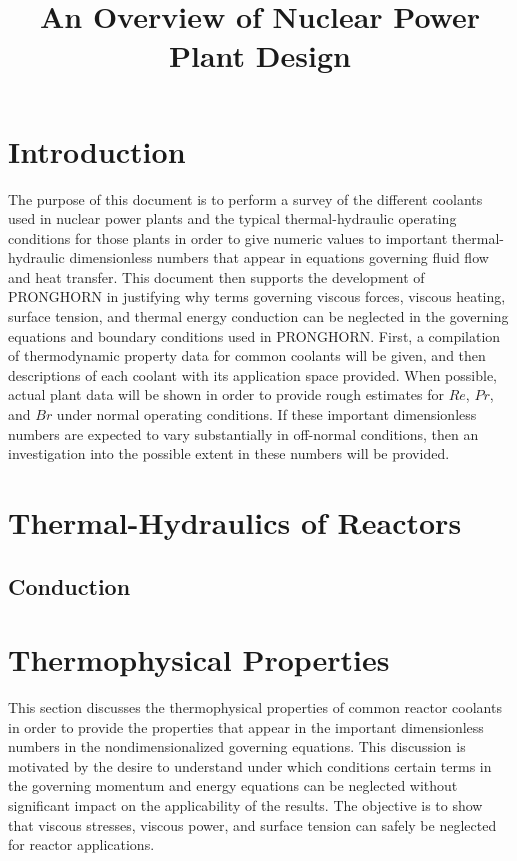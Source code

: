 \documentclass[10pt]{article}
\numberwithin{equation}{section} %
\begin{document}
\title{An Overview of Nuclear Power Plant Design}
\maketitle

\tableofcontents
\clearpage

\section{Introduction}
The purpose of this document is to perform a survey of the different coolants used in nuclear power plants and the typical thermal-hydraulic operating conditions for those plants in order to give numeric values to important thermal-hydraulic dimensionless numbers that appear in equations governing fluid flow and heat transfer. This document then supports the development of PRONGHORN in justifying why terms governing viscous forces, viscous heating, surface tension, and thermal energy conduction can be neglected in the governing equations and boundary conditions used in PRONGHORN. First, a compilation of thermodynamic property data for common coolants will be given, and then descriptions of each coolant with its application space provided. When possible, actual plant data will be shown in order to provide rough estimates for \(Re\), \(Pr\), and \(Br\) under normal operating conditions. If these important dimensionless numbers are expected to vary substantially in off-normal conditions, then an investigation into the possible extent in these numbers will be provided. 

\section{Thermal-Hydraulics of Reactors}

\subsection{Conduction}


\section{Thermophysical Properties}
\label{sec:ThermophysicalProperties}

This section discusses the thermophysical properties of common reactor coolants in order to provide the properties that appear in the important dimensionless numbers in the nondimensionalized governing equations. This discussion is motivated by the desire to understand under which conditions certain terms in the governing momentum and energy equations can be neglected without significant impact on the applicability of the results. The objective is to show that viscous stresses, viscous power, and surface tension can safely be neglected for reactor applications. 
\end{document}
